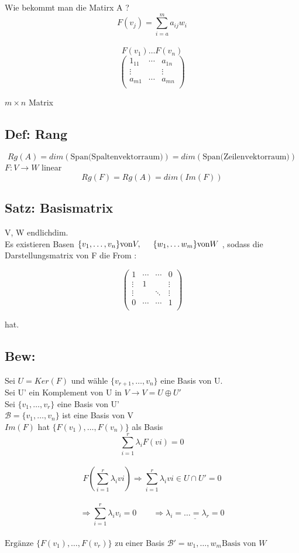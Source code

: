 \documentclass[titlepage,12pt,a4paper,ngerman]{report}
\begin{document}
Wie bekommt man die Matirx A ?\\
$$ F(v_j) = \sum_{i = a}^m a_{ij} w_i$$\\
$$F(v_1) \dots F(v_n)$$ 
\nopagebreak
$$\begin{pmatrix}
1_{11} & \cdots & a_{1n} \\
\vdots & & \vdots\\
a_{m1} & \cdots & a_{mn}\\
\end{pmatrix} $$

\begin{flushright}
	$m\times n$ Matrix
\end{flushright}


\subsection{Def: Rang}
$$Rg(A) = dim (\textrm{Span(Spaltenvektorraum)}) = dim (\textrm{Span(Zeilenvektorraum)})$$
$F: V \rightarrow W$ linear $$ Rg(F) = Rg(A) = dim (Im(F)) $$

\subsection{Satz: Basismatrix}
V, W endlichdim.\\
Es existieren Basen $\{v_1,\dots, v_n\} \textrm{von} V, \hspace{.5cm} \{w_1,\dots w_m\} \textrm{von} W$ , sodass die Darstellungsmatrix von F die From :

$$\left(\begin{array}{ccccc}
1 & \cdots & \cdots & 0 \\
\vdots & 1 & & \vdots \\
\vdots & & \ddots & \vdots \\
0 & \cdots & \cdots & 1 \\
\end{array} \right)$$

\noindent hat.

\subsection{Bew:}
Sei $U = Ker(F)$ und wähle $\{v_{r+1},\dots, v_n\}$ eine Basis von U. \\
Sei U' ein Komplement von U in $V \rightarrow V = U\oplus U'$\\
Sei $\{v_1,\dots, v_r\}$ eine Basis von U'\\
$\mathcal{B} = \{v_1,\dots , v_n\}$ ist eine Basis von V\\
$Im(F)$ hat $\{F(v_1),\dots, F(v_n)\}$ als Basis\\
$$\sum^{r}_{i = 1} \lambda_i F(vi) = 0$$\\
$$F(\sum^{r}_{i = 1} \lambda_i vi) \Rightarrow \sum^{r}_{i = 1} \lambda_i vi \in U \cap U' = {0}$$\\
$$\Rightarrow \sum^{r}_{i = 1} \lambda_i v_i = 0\qquad \Rightarrow \underline{\lambda_i = \dots = \lambda_r = 0}$$\\
$ \text{Ergänze } \{F(v_1), \dots , F(v_r)\}$ zu einer Basis $ \mathcal{B}' = {w_1, \dots , w_m} \text{Basis von } W$\
\end{document}
